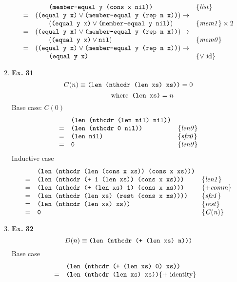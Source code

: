 \documentclass[fleqn]{article}
\newenvironment{proof}
  {\[\begin{array}{lll}}
  {\end{array}\]}
\newcommand{\law}[1]{\{\mathit{#1}\}}
\renewcommand{\c}[1]{\mbox{\texttt{#1}}}
\begin{document}
\begin{enumerate}
\begin{proof}
          & \qquad \c{(member-equal y (cons x nil))} & \law{list} \\
        = & (\c{(equal y x)} \vee \c{(member-equal y (rep n x))}) \to & \\
          & \qquad (\c{(equal y x)} \vee \c{(member-equal y nil)}) & \law{mem1} \times 2 \\
        = & (\c{(equal y x)} \vee \c{(member-equal y (rep n x))}) \to & \\
          & \qquad (\c{(equal y x)} \vee \c{nil}) & \law{mem0} \\
        = & (\c{(equal y x)} \vee \c{(member-equal y (rep n x))}) \to & \\
          & \qquad \c{(equal y x)} & \law{\vee\ \mathrm{id}} \\
      \end{proof}
    \item {\bf Ex. 31}
      \[ C(n) \equiv \c{(len (nthcdr (len xs) xs))} = 0 \]
      \[ \qquad \qquad \mathrm{where} \c{ (len xs)} = n \]
      Base case: $C(0)$
      \begin{proof}
          & \c{(len (nthcdr (len nil) nil))} & \\
        = & \c{(len (nthcdr 0 nil))} & \law{len0} \\
        = & \c{(len nil)} & \law{sfx0} \\
        = & \c{0} & \law{len0} \\
      \end{proof}
      Inductive case
      \begin{proof}
          & \c{(len (nthcdr (len (cons x xs)) (cons x xs)))} & \\
        = & \c{(len (nthcdr (+ 1 (len xs)) (cons x xs)))} & \law{len1} \\
        = & \c{(len (nthcdr (+ (len xs) 1) (cons x xs)))} & \law{+ comm} \\
        = & \c{(len (nthcdr (len xs) (rest (cons x xs))))} & \law{sfx1} \\
        = & \c{(len (nthcdr (len xs) xs))} & \law{rest} \\
        = & \c{0} & \law{C(n)} \\
      \end{proof}
    \item {\bf Ex. 32}
      \[ D(n) \equiv \c{(len (nthcdr (+ (len xs) n)))} \]
      Base case
      \begin{proof}
          & \c{(len (nthcdr (+ (len xs) 0) xs))} & \\
        = & \c{(len (nthcdr (len xs) xs))} \law{+\ \mathrm{identity}} & \\

\end{proof}
\end{enumerate}
\end{document}
